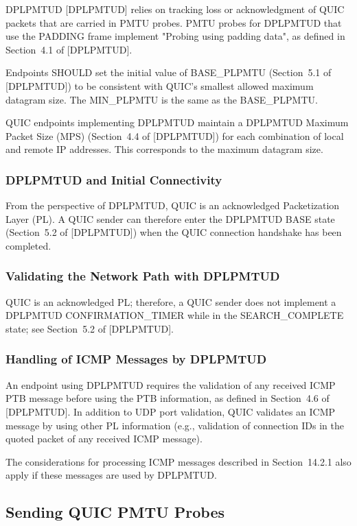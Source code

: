 \documentclass{article}
\begin{document}
DPLPMTUD [DPLPMTUD] relies on tracking loss or acknowledgment of QUIC packets that are carried in PMTU probes.  PMTU probes for DPLPMTUD that use the PADDING frame implement "Probing using padding data", as defined in Section~4.1 of [DPLPMTUD].

Endpoints SHOULD set the initial value of BASE\_PLPMTU (Section~5.1 of [DPLPMTUD]) to be consistent with QUIC's smallest allowed maximum datagram size.  The MIN\_PLPMTU is the same as the BASE\_PLPMTU.

QUIC endpoints implementing DPLPMTUD maintain a DPLPMTUD Maximum Packet Size (MPS) (Section~4.4 of [DPLPMTUD]) for each combination of local and remote IP addresses.  This corresponds to the maximum datagram size.

\subsubsection{DPLPMTUD and Initial Connectivity}

From the perspective of DPLPMTUD, QUIC is an acknowledged Packetization Layer (PL).  A QUIC sender can therefore enter the DPLPMTUD BASE state (Section~5.2 of [DPLPMTUD]) when the QUIC connection handshake has been completed.

\subsubsection{Validating the Network Path with DPLPMTUD}

QUIC is an acknowledged PL; therefore, a QUIC sender does not implement a DPLPMTUD CONFIRMATION\_TIMER while in the SEARCH\_COMPLETE state; see Section~5.2 of [DPLPMTUD].

\subsubsection{Handling of ICMP Messages by DPLPMTUD}

An endpoint using DPLPMTUD requires the validation of any received ICMP PTB message before using the PTB information, as defined in Section~4.6 of [DPLPMTUD].  In addition to UDP port validation, QUIC validates an ICMP message by using other PL information (e.g., validation of connection IDs in the quoted packet of any received ICMP message).

The considerations for processing ICMP messages described in Section~14.2.1 also apply if these messages are used by DPLPMTUD.

\subsection{Sending QUIC PMTU Probes}
\end{document}
